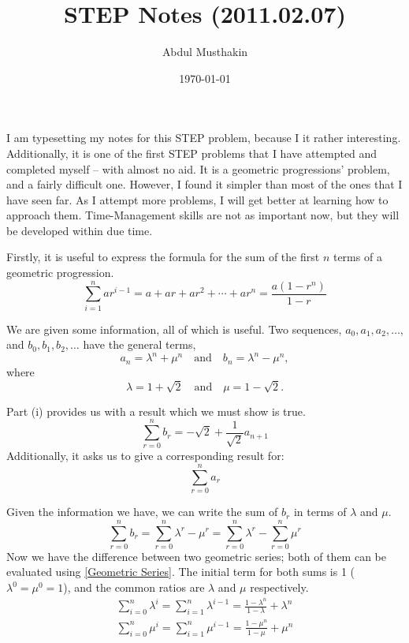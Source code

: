 \documentclass[12pt]{article}
\title{STEP Notes (2011.02.07)}
\author{Abdul Musthakin}
\date{\today}
\begin{document}
\maketitle

I am typesetting my notes for this STEP problem, because I it rather interesting.
Additionally, it is one of the first STEP problems that I have attempted and completed myself -- with almost no aid.
It is a geometric progressions' problem, and a fairly difficult one.
However, I found it simpler than most of the ones that I have seen far.
As I attempt more problems, I will get better at learning how to approach them.
Time-Management skills are not as important now, but they will be developed within due time.

Firstly, it is useful to express the formula for the sum of the first $n$ terms of a geometric progression.
\begin{equation}
    \sum_{i=1}^n ar^{i-1} = a + ar + ar^2 + \cdots + ar^n = \frac{a(1-r^n)}{1-r} \label{Geometric Series}
\end{equation}

We are given some information, all of which is useful.
Two sequences, $a_0, a_1, a_2, \ldots$, and $b_0, b_1, b_2, \ldots$ have the general terms,
\begin{equation*}
    a_n = \lambda^n + \mu^n \quad \text{and} \quad b_n = \lambda^n - \mu^n,
\end{equation*}
where
\begin{equation*}
    \lambda = 1 + \sqrt{2} \quad \text{and} \quad \mu = 1 - \sqrt{2}.
\end{equation*}

Part (i) provides us with a result which we must show is true.
\begin{equation}
    \sum_{r=0}^{n} b_r = -\sqrt{2} + \frac{1}{\sqrt{2}} a_{n+1}
\end{equation}
Additionally, it asks us to give a corresponding result for:
\begin{equation*}
    \sum_{r=0}^{n} a_r
\end{equation*}

Given the information we have, we can write the sum of $b_r$ in terms of $\lambda$ and $\mu$.
\begin{equation*}
    \sum_{r=0}^{n} b_r = \sum_{r=0}^{n} \lambda^r - \mu^r = \sum_{r=0}^{n} \lambda^r - \sum_{r=0}^{n} \mu^r
\end{equation*}
Now we have the difference between two geometric series; both of them can be evaluated using \eqref{Geometric Series}.
The initial term for both sums is 1 ($\lambda^0=\mu^0=1$), and the common ratios are $\lambda$ and $\mu$ respectively.
\begin{align}
    \sum_{i=0}^{n} \lambda^i = \sum_{i=1}^{n} \lambda^{i-1} = \frac{1-\lambda^n}{1-\lambda} + \lambda^n \\
    \sum_{i=0}^{n} \mu^i = \sum_{i=1}^{n} \mu^{i-1} = \frac{1-\mu^n}{1-\mu} + \mu^n
\end{align}
\end{document}
